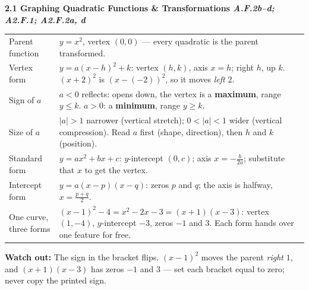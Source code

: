 \documentclass[10pt]{article}
\newcommand{\sghead}[2]{%
  \boxguard[10]%
  \vspace{4pt}\par\noindent
  \colorbox{forest}{\parbox{\dimexpr\linewidth-2\fboxsep}{%
    \small\color{white}\bfseries #1 \hfill \textmd{\itshape\scriptsize\color{forestmid} #2}}}%
  \vspace{2pt}\par}
\newcommand{\sgwatch}[1]{%
  \vspace{1pt}\par\noindent
  \colorbox{redbg}{\parbox{\dimexpr\linewidth-2\fboxsep}{%
    \footnotesize\textbf{\textcolor{redacc}{Watch out:}} #1}}%
  \vspace{1pt}\par}
\newcommand{\sgtabsetup}{\renewcommand{\arraystretch}{1.06}\footnotesize}
\begin{document}
\sghead{2.1 \quad Graphing Quadratic Functions \& Transformations}{A.F.2b--d; A2.F.1; A2.F.2a, d}
{\sgtabsetup
\begin{tabularx}{\linewidth}{@{} G X @{}}
Parent function & $y=x^2$, vertex $(0,0)$ --- every quadratic is the parent transformed. \\
Vertex form & $y=a(x-h)^2+k$: vertex $(h,k)$, axis $x=h$; right $h$, up $k$. $(x+2)^2$ is
  $(x-(-2))^2$, so it moves \emph{left} $2$. \\
Sign of $a$ & $a<0$ reflects: opens down, the vertex is a \textbf{maximum}, range $y\le k$.
  $a>0$: a \textbf{minimum}, range $y\ge k$. \\
Size of $a$ & $|a|>1$ narrower (vertical stretch); $0<|a|<1$ wider (vertical compression). Read
  $a$ first (shape, direction), then $h$ and $k$ (position). \\
Standard form & $y=ax^2+bx+c$: $y$-intercept $(0,c)$; axis $x=-\frac{b}{2a}$; substitute that
  $x$ to get the vertex. \\
Intercept form & $y=a(x-p)(x-q)$: zeros $p$ and $q$; the axis is halfway, $x=\frac{p+q}{2}$. \\
One curve, three forms & $(x-1)^2-4=x^2-2x-3=(x+1)(x-3)$: vertex $(1,-4)$, $y$-intercept $-3$,
  zeros $-1$ and $3$. Each form hands over one feature for free. \\
\end{tabularx}}
\sgwatch{The sign in the bracket flips. $(x-1)^2$ moves the parent \emph{right} $1$, and
$(x+1)(x-3)$ has zeros $-1$ and $3$ --- set each bracket equal to zero; never copy the printed
sign.}
\end{document}

